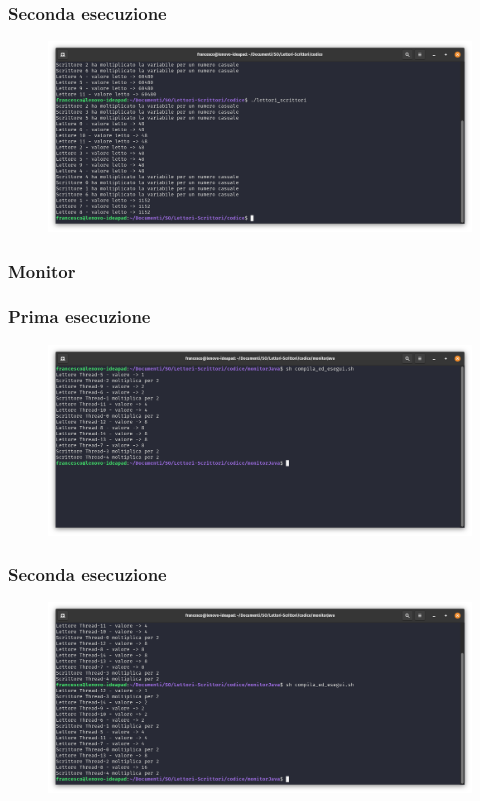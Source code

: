 \documentclass[10pt]{beamer}
\begin{document}
	\begin{frame}[fragile]
		\frametitle{Seconda esecuzione}
		\begin{figure}
			\centering
			\includegraphics[width=1.03\linewidth]{img/esecuzione/programC2}
			\label{fig:programc1}
		\end{figure}
	\end{frame}


\begin{frame}
	\frametitle{Monitor}
	
\end{frame}

	\begin{frame}[fragile]
		\frametitle{Prima esecuzione}
		\begin{figure}
			\centering
			\includegraphics[width=1.03\linewidth]{img/esecuzione/programJ1}
			\label{fig:programc1}
		\end{figure}
	\end{frame}

	\begin{frame}[fragile]
		\frametitle{Seconda esecuzione}
		\begin{figure}
			\centering
			\includegraphics[width=1.03\linewidth]{img/esecuzione/programJ2}
			\label{fig:programc1}
		\end{figure}
	\end{frame}
	
\end{document}
